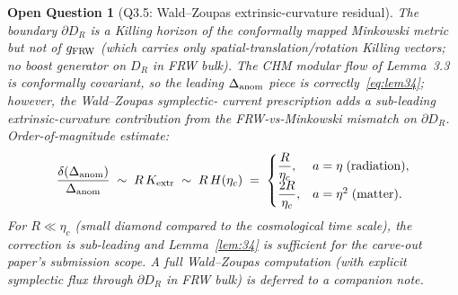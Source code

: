 \documentclass[11pt]{article}
\newtheorem*{openq}{Open Question}
\begin{document}
\begin{openq}[Q3.5: Wald--Zoupas extrinsic-curvature residual]
The boundary $\partial D_R$ is a Killing horizon of the conformally
mapped Minkowski metric but \emph{not} of $g_{\rm FRW}$ (which carries
only spatial-translation/rotation Killing vectors; no boost generator
on $D_R$ in FRW bulk).  The CHM modular flow of Lemma~3.3 is
conformally covariant, so the leading $\Delta_{\rm anom}$ piece is
correctly~\eqref{eq:lem34}; however, the Wald--Zoupas symplectic-
current prescription \cite{WaldZoupas2000} adds a sub-leading
extrinsic-curvature contribution from the FRW-vs-Minkowski mismatch on
$\partial D_R$.  Order-of-magnitude estimate:
\[
   \frac{\delta(\Delta_{\rm anom})}{\Delta_{\rm anom}}\;\sim\; R\,K_{\rm extr}\;\sim\; R\,H(\eta_c)
   \;=\;\begin{cases}\dfrac{R}{\eta_c}, & a=\eta\;\text{(radiation)},\\
        \dfrac{2R}{\eta_c}, & a=\eta^2\;\text{(matter)}.\end{cases}
\]
For $R\ll\eta_c$ (small diamond compared to the cosmological time
scale), the correction is sub-leading and Lemma~\ref{lem:34} is
sufficient for the carve-out paper's submission scope.  A full
Wald--Zoupas computation (with explicit symplectic flux through
$\partial D_R$ in FRW bulk) is deferred to a companion note.
\end{openq}
\end{document}
